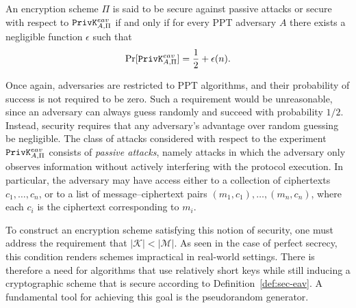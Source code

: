 \begin{definition}\label{def:sec-eav}
An encryption scheme $\Pi$ is said to be secure against passive attacks or secure with respect to $\mathtt{PrivK}^{eav}_{A,\Pi}$ if and only if for every PPT adversary $A$ there exists a negligible function $\epsilon$ such that
\begin{align*}
\mathrm{Pr}[\mathtt{PrivK}^{eav}_{A,\Pi}]= \frac{1}{2} + \epsilon(n).
\end{align*}
\end{definition}
Once again, adversaries are restricted to PPT algorithms, and their probability of success is not required to be zero. Such a requirement would be unreasonable, since an adversary can always guess randomly and succeed with probability $1/2$. Instead, security requires that any adversary’s advantage over random guessing be negligible. The class of attacks considered with respect to the experiment $\mathtt{PrivK}^{eav}_{A,\Pi}$ consists of \emph{passive attacks}, namely attacks in which the adversary only observes information without actively interfering with the protocol execution. In particular, the adversary may have access either to a collection of ciphertexts $c_1, \dots, c_n$, or to a list of message–ciphertext pairs $(m_1, c_1), \dots, (m_n, c_n)$, where each $c_i$ is the ciphertext corresponding to $m_i$.

To construct an encryption scheme satisfying this notion of security, one must address the requirement that $|\mathcal{K}| < |\mathcal{M}|$. As seen in the case of perfect secrecy, this condition renders schemes impractical in real-world settings. There is therefore a need for algorithms that use relatively short keys while still inducing a cryptographic scheme that is secure according to Definition~\ref{def:sec-eav}. A fundamental tool for achieving this goal is the pseudorandom generator.

